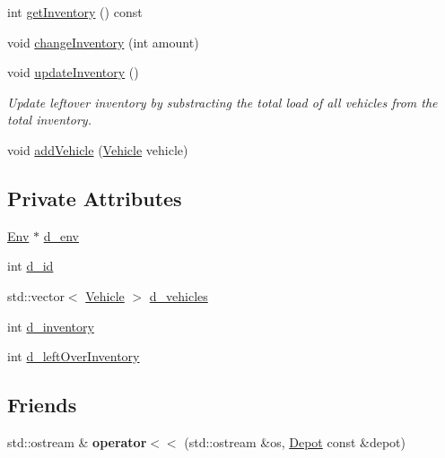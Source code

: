 \begin{DoxyCompactItemize}
int \hyperlink{class_depot_ab8d9a6cba5eb3aa4d860e13435dd64df}{get\+Inventory} () const
\item 
void \hyperlink{class_depot_a91c675fef3c934b87f387050c43f2087}{change\+Inventory} (int amount)
\item 
\mbox{\label{class_depot_aad95f075e3df31cfcb7951d4572265f3}} 
void \hyperlink{class_depot_aad95f075e3df31cfcb7951d4572265f3}{update\+Inventory} ()
\begin{DoxyCompactList}\small\item\em Update leftover inventory by substracting the total load of all vehicles from the total inventory. \end{DoxyCompactList}\item 
void \hyperlink{class_depot_a68e6c378cf4527839c67e8e417560744}{add\+Vehicle} (\hyperlink{class_vehicle}{Vehicle} vehicle)
\end{DoxyCompactItemize}
\subsection*{Private Attributes}
\begin{DoxyCompactItemize}
\item 
\hyperlink{class_env}{Env} $\ast$ \hyperlink{class_depot_a182a0a8e85a7cee44aaa9c1895a8d05a}{d\+\_\+env}
\item 
int \hyperlink{class_depot_a1a1a1a9e2d0952f6446247f706fcaa97}{d\+\_\+id}
\item 
std\+::vector$<$ \hyperlink{class_vehicle}{Vehicle} $>$ \hyperlink{class_depot_a3037941bb91b32aed2a37bf39cda0917}{d\+\_\+vehicles}
\item 
int \hyperlink{class_depot_acf5df9f1ee607052c50fc2f56d167609}{d\+\_\+inventory}
\item 
int \hyperlink{class_depot_af81ace5d9d43b962c966f397b527ee48}{d\+\_\+left\+Over\+Inventory}
\end{DoxyCompactItemize}
\subsection*{Friends}
\begin{DoxyCompactItemize}
\item 
\mbox{\label{class_depot_a2b64a812d30d31b49205413ae80a159a}} 
std\+::ostream \& {\bfseries operator$<$$<$} (std\+::ostream \&os, \hyperlink{class_depot}{Depot} const \&depot)
\end{DoxyCompactItemize}


